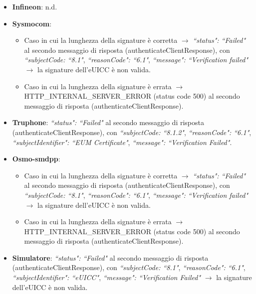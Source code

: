 \documentclass[10pt, oneside]{book}
\begin{document}
\begin{itemize}
\item \textbf{Infineon}: n.d.
\item \textbf{Sysmocom}:
\begin{itemize}
\item Caso in cui la lunghezza della signature è corretta $\rightarrow$ \textit{``status": ``Failed"} al secondo messaggio di risposta (authenticateClientResponse), con \textit{``subjectCode: ``8.1"}, \textit{``reasonCode": ``6.1"}, \textit{``message": ``Verification failed"} $\rightarrow$ la signature dell'eUICC è non valida.
\item Caso in cui la lunghezza della signature è errata $\rightarrow$ HTTP\_INTERNAL\_SERVER\_ERROR (status code 500) al secondo messaggio di risposta (authenticateClientResponse).
\end{itemize}
\item \textbf{Truphone}: \textit{``status": ``Failed"} al secondo messaggio di risposta (authenticateClientResponse), con \textit{``subjectCode: ``8.1.2"}, \textit{``reasonCode": ``6.1"}, \textit{``subjectIdentifier": ``EUM Certificate"}, \textit{``message": ``Verification Failed"}.
\item \textbf{Osmo-smdpp}: 
\begin{itemize}
\item Caso in cui la lunghezza della signature è corretta $\rightarrow$ \textit{``status": ``Failed"} al secondo messaggio di risposta (authenticateClientResponse), con \textit{``subjectCode: ``8.1"}, \textit{``reasonCode": ``6.1"}, \textit{``message": ``Verification failed"} $\rightarrow$ la signature dell'eUICC è non valida.
\item Caso in cui la lunghezza della signature è errata $\rightarrow$ HTTP\_INTERNAL\_SERVER\_ERROR (status code 500) al secondo messaggio di risposta (authenticateClientResponse).
\end{itemize}
\item \textbf{Simulatore}: \textit{``status": ``Failed"} al secondo messaggio di risposta (authenticateClientResponse), con \textit{``subjectCode: ``8.1"}, \textit{``reasonCode": ``6.1"}, \textit{``subjectIdentifier": ``eUICC"}, \textit{``message": ``Verification Failed"} $\rightarrow$ la signature dell'eUICC è non valida.
\end{itemize}
\end{document}
